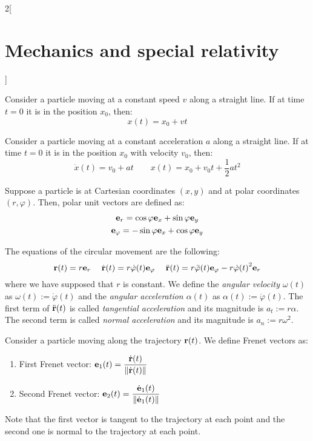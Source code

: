 \documentclass[../../../main.tex]{subfiles}
\begin{document}
\begin{multicols}{2}[\section{Mechanics and special relativity}]
\begin{definition}
  \end{definition}
  \begin{prop}
    Consider a particle moving at a constant speed $v$ along a straight line. If at time $t=0$ it is in the position $x_0$, then: $$x(t)=x_0+vt$$
  \end{prop}
  \begin{prop}
    Consider a particle moving at a constant acceleration $a$ along a straight line. If at time $t=0$ it is in the position $x_0$ with velocity $v_0$, then:
    $$\dot{x}(t)=v_0+at\qquad x(t)=x_0+v_0t+\frac{1}{2}at^2$$
  \end{prop}
  \begin{definition}
    Suppose a particle is at Cartesian coordinates $(x,y)$ and at polar coordinates $(r,\varphi)$. Then, polar unit vectors are defined as:
    \begin{gather*}
      \boldsymbol{\mathrm{e}}_r=\cos\varphi\boldsymbol{\mathrm{e}}_x+\sin\varphi\boldsymbol{\mathrm{e}}_y\\
      \boldsymbol{\mathrm{e}}_\varphi=-\sin\varphi\boldsymbol{\mathrm{e}}_x+\cos\varphi\boldsymbol{\mathrm{e}}_y
    \end{gather*}
  \end{definition}
  \begin{definition}
    The equations of the circular movement are the following: $$\boldsymbol{\mathrm{r}}(t)=r\boldsymbol{\mathrm{e}}_r\quad\;\dot{\boldsymbol{\mathrm{r}}}(t)=r\dot{\varphi}(t)\boldsymbol{\mathrm{e}}_\varphi\quad\;\ddot{\boldsymbol{\mathrm{r}}}(t)=r\ddot{\varphi}(t)\boldsymbol{\mathrm{e}}_\varphi-r{\dot{\varphi}(t)}^2\boldsymbol{\mathrm{e}}_r$$ where we have supposed that $r$ is constant. We define the \textit{angular velocity $\omega(t)$} as $\omega(t):=\dot{\varphi}(t)$ and the \textit{angular acceleration $\alpha(t)$} as $\alpha(t):=\ddot{\varphi}(t)$. The first term of $\ddot{\boldsymbol{\mathrm{r}}}(t)$ is called \textit{tangential acceleration} and its magnitude is $a_t:=r\alpha$. The second term is called \textit{normal acceleration} and its magnitude is $a_n:=r\omega^2$.
  \end{definition}
  \begin{definition}
    Consider a particle moving along the trajectory $\boldsymbol{\mathrm{r}}(t)$. We define Frenet vectors as:
    \begin{enumerate}
      \item First Frenet vector: $\displaystyle\boldsymbol{\mathrm{e}}_1(t)=\frac{\dot{\boldsymbol{\mathrm{r}}}(t)}{\|\dot{\boldsymbol{\mathrm{r}}}(t)\|}$
      \item Second Frenet vector: $\displaystyle\boldsymbol{\mathrm{e}}_2(t)=\frac{\dot{\boldsymbol{\mathrm{e}}}_1(t)}{\|\dot{\boldsymbol{\mathrm{e}}}_1(t)\|}$
    \end{enumerate}
    Note that the first vector is tangent to the trajectory at each point and the second one is normal to the trajectory at each point.


\end{definition}
\end{multicols}
\end{document}
